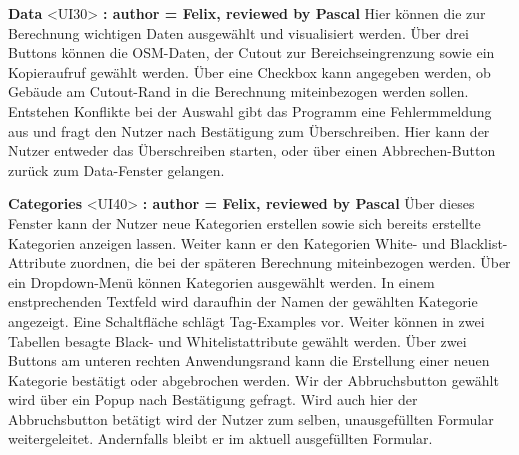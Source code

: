 \documentclass[parskip=full]{scrartcl} %
\begin{document}
\textbf{Data }<UI30>\textbf{ : author = Felix, reviewed by Pascal}
Hier können die zur Berechnung wichtigen Daten ausgewählt und visualisiert werden.
Über drei Buttons können die OSM-Daten, der Cutout zur Bereichseingrenzung sowie ein Kopieraufruf gewählt werden. Über eine Checkbox kann angegeben werden, ob Gebäude am Cutout-Rand in die Berechnung miteinbezogen werden sollen.
Entstehen Konflikte bei der Auswahl gibt das Programm eine Fehlermmeldung aus und fragt den Nutzer nach Bestätigung zum Überschreiben. Hier kann der Nutzer entweder das Überschreiben starten, oder über einen Abbrechen-Button zurück zum Data-Fenster gelangen.

\textbf{Categories }<UI40>\textbf{ : author = Felix, reviewed by Pascal}
Über dieses Fenster kann der Nutzer neue Kategorien erstellen sowie sich bereits erstellte Kategorien anzeigen lassen. Weiter kann er den Kategorien White- und Blacklist-Attribute zuordnen, die bei der späteren Berechnung miteinbezogen werden.
Über ein Dropdown-Menü können Kategorien ausgewählt werden. In einem enstprechenden Textfeld wird daraufhin der Namen der gewählten Kategorie angezeigt. Eine Schaltfläche schlägt Tag-Examples vor. Weiter können in zwei Tabellen besagte Black- und Whitelistattribute gewählt werden.
Über zwei Buttons am unteren rechten Anwendungsrand kann die Erstellung einer neuen Kategorie bestätigt oder abgebrochen werden. 
Wir der Abbruchsbutton gewählt wird über ein Popup nach Bestätigung gefragt. Wird auch hier der Abbruchsbutton betätigt wird der Nutzer zum selben, unausgefüllten Formular weitergeleitet. Andernfalls bleibt er im aktuell ausgefüllten Formular.
\end{document}
